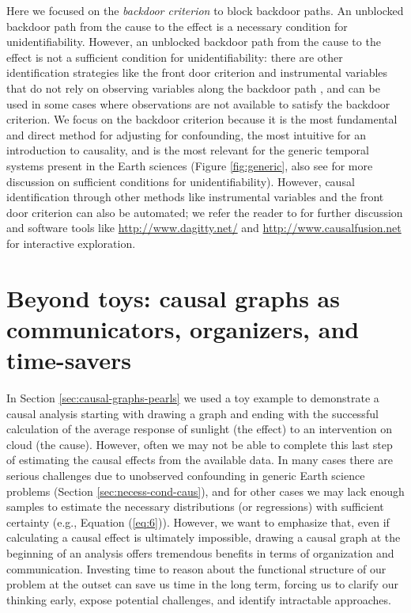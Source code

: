 \documentclass[12pt]{article}
\begin{document}
Here we focused on the \emph{backdoor criterion} to block backdoor
paths. An unblocked backdoor path from the cause to the effect is a
necessary condition for unidentifiability. However, an unblocked
backdoor path from the cause to the effect is not a sufficient
condition for unidentifiability: there are other identification
strategies like the front door criterion and instrumental variables
that do not rely on observing variables along the backdoor path
\citep{pearl2009causality}, and can be used in some cases where
observations are not available to satisfy the backdoor criterion. We
focus on the backdoor criterion because it is the most fundamental and
direct method for adjusting for confounding, the most intuitive for an
introduction to causality, and is the most relevant for the generic
temporal systems present in the Earth sciences (Figure
\ref{fig:generic}, also see \citet{tian2002general} for more discussion on
sufficient conditions for unidentifiability).  However, causal
identification through other methods like instrumental variables and
the front door criterion can also be automated; we refer the reader to
\citet{pearl2009causality} for further discussion and software tools
like \url{http://www.dagitty.net/} and
\url{http://www.causalfusion.net} for interactive exploration.


\section{Beyond toys: causal graphs as communicators, organizers, and
  time-savers}\label{sec:causal-graphs-as}

In Section \ref{sec:causal-graphs-pearls} we used a toy example to
demonstrate a causal analysis starting with drawing a graph and ending
with the successful calculation of the average response of sunlight
(the effect) to an intervention on cloud (the cause). However, often
we may not be able to complete this last step of estimating the causal
effects from the available data. In many cases there are serious
challenges due to unobserved confounding in generic Earth science
problems (Section \ref{sec:necess-cond-caus}), and for other cases we
may lack enough samples to estimate the necessary distributions (or
regressions) with sufficient certainty (e.g., Equation
(\ref{eq:6})). However, we want to emphasize that, even if calculating
a causal effect is ultimately impossible, drawing a causal graph at
the beginning of an analysis offers tremendous benefits in terms of
organization and communication. Investing time to reason about the
functional structure of our problem at the outset can save us time in
the long term, forcing us to clarify our thinking early, expose
potential challenges, and identify intractable approaches.
\end{document}
